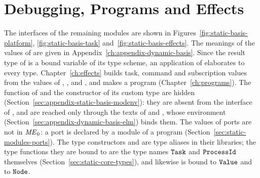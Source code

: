 \section{Debugging, Programs and Effects}\label{sec:appendix-static-basis-platform}

The interfaces of the remaining modules are shown in
Figures~\ref{fig:static-basis-platform}, \ref{fig:static-basis-task}
and~\ref{fig:static-basis-effects}.
The meanings of the values of  are given in
Appendix~\ref{ch:appendix-dynamic-basis}. Since the result type of
 is a bound variable of its type scheme, an application of
 elaborates to every type. %
Chapter~\ref{ch:effects} builds task, command and subscription values from
the values of , ,  and
, and  makes a program
(Chapter~\ref{ch:programs}). %
The function  of  and the constructor  of its
custom type  are hidden
(Section~\ref{sec:appendix-static-basis-modenv}): they are absent from the
interface of , and are reached only through the texts of
 and , whose environment
(Section~\ref{sec:appendix-dynamic-basis-elm}) binds them. The
values of ports are not in $\mathit{ME}_0$: a port is declared by a module of a
program (Section~\ref{sec:static-modules-ports}).
The type constructors  and  are type aliases in
their libraries; the type functions they are bound to are the type names
$\mathtt{Task}$ and $\mathtt{ProcessId}$ themselves (Section~\ref{sec:static-core-types}),
and likewise  is bound to $\mathtt{Value}$ and 
to $\mathtt{Node}$.

